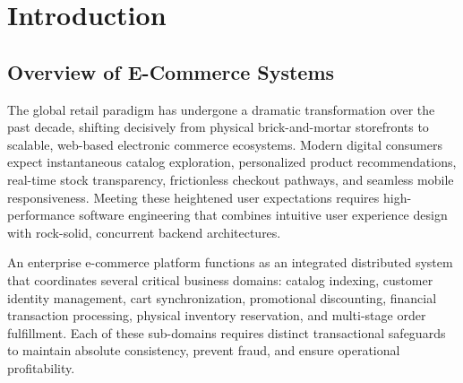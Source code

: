 \chapter{Introduction}
\label{ch:introduction}

\section{Overview of E-Commerce Systems}
The global retail paradigm has undergone a dramatic transformation over the past decade, shifting decisively from physical brick-and-mortar storefronts to scalable, web-based electronic commerce ecosystems. Modern digital consumers expect instantaneous catalog exploration, personalized product recommendations, real-time stock transparency, frictionless checkout pathways, and seamless mobile responsiveness. Meeting these heightened user expectations requires high-performance software engineering that combines intuitive user experience design with rock-solid, concurrent backend architectures.

An enterprise e-commerce platform functions as an integrated distributed system that coordinates several critical business domains: catalog indexing, customer identity management, cart synchronization, promotional discounting, financial transaction processing, physical inventory reservation, and multi-stage order fulfillment. Each of these sub-domains requires distinct transactional safeguards to maintain absolute consistency, prevent fraud, and ensure operational profitability.

